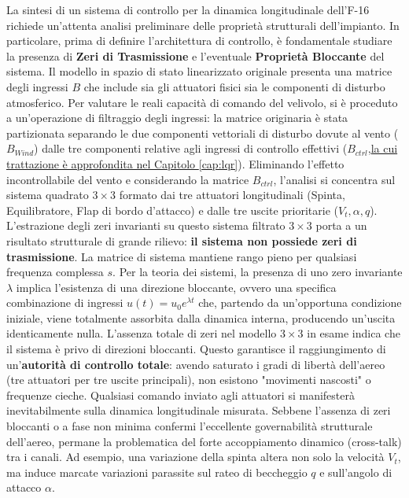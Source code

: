 La sintesi di un sistema di controllo per la dinamica longitudinale dell'F-16 richiede un'attenta analisi preliminare delle proprietà strutturali dell'impianto. In particolare, prima di definire l'architettura di controllo, è fondamentale studiare la presenza di \textbf{Zeri di Trasmissione} e l'eventuale \textbf{Proprietà Bloccante} del sistema. Il modello in spazio di stato linearizzato originale presenta una matrice degli ingressi $B$ che include sia gli attuatori fisici sia le componenti di disturbo atmosferico. Per valutare le reali capacità di comando del velivolo, si è proceduto a un'operazione di filtraggio degli ingressi: la matrice originaria è stata partizionata separando le due componenti vettoriali di disturbo dovute al vento ($B_{Wind}$) dalle tre componenti relative agli ingressi di controllo effettivi ($B_{ctrl}$,\hyperref[chap:disturbi_vento]{la cui trattazione è approfondita nel Capitolo \ref{cap:lqr}}). Eliminando l'effetto incontrollabile del vento e considerando la matrice $B_{ctrl}$, l'analisi si concentra sul sistema quadrato $3 \times 3$ formato dai tre attuatori longitudinali (Spinta, Equilibratore, Flap di bordo d'attacco) e dalle tre uscite prioritarie ($V_t, \alpha, q$). L'estrazione degli zeri invarianti su questo sistema filtrato $3 \times 3$ porta a un risultato strutturale di grande rilievo: \textbf{il sistema non possiede zeri di trasmissione}. La matrice di sistema mantiene rango pieno per qualsiasi frequenza complessa $s$. Per la teoria dei sistemi, la presenza di uno zero invariante $\lambda$ implica l'esistenza di una direzione bloccante, ovvero una specifica combinazione di ingressi $u(t) = u_0 e^{\lambda t}$ che, partendo da un'opportuna condizione iniziale, viene totalmente assorbita dalla dinamica interna, producendo un'uscita identicamente nulla. L'assenza totale di zeri nel modello $3 \times 3$ in esame indica che il sistema è privo di direzioni bloccanti. Questo garantisce il raggiungimento di un'\textbf{autorità di controllo totale}: avendo saturato i gradi di libertà dell'aereo (tre attuatori per tre uscite principali), non esistono "movimenti nascosti" o frequenze cieche. Qualsiasi comando inviato agli attuatori si manifesterà inevitabilmente sulla dinamica longitudinale misurata. Sebbene l'assenza di zeri bloccanti o a fase non minima confermi l'eccellente governabilità strutturale dell'aereo, permane la problematica del forte accoppiamento dinamico (cross-talk) tra i canali. Ad esempio, una variazione della spinta altera non solo la velocità $V_t$, ma induce marcate variazioni parassite sul rateo di beccheggio $q$ e sull'angolo di attacco $\alpha$. 

